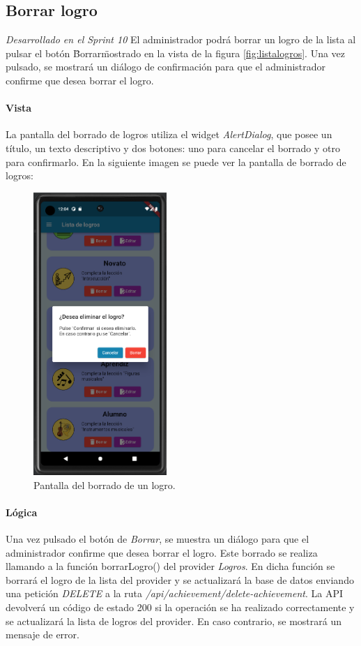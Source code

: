 \subsection{Borrar logro} 

\textit{Desarrollado en el Sprint 10}
El administrador podrá borrar un logro de la lista al pulsar el botón \"Borrar\" mostrado en la vista de la figura \ref{fig:listalogros}. 
Una vez pulsado, se mostrará un diálogo de confirmación para que el administrador confirme que desea borrar el logro.

\newpage
\paragraph*{Vista}
La pantalla del borrado de logros utiliza el widget \textit{AlertDialog}, que posee
un título, un texto descriptivo y dos botones: uno para cancelar el borrado y otro para confirmarlo.
En la siguiente imagen se puede ver la pantalla de borrado de logros:


\begin{figure}[H]
  \centering
  \includegraphics[width=0.45\textwidth]{imagenes/c7/borrarlogro.png}
  \caption{Pantalla del borrado de un logro.} 
  \label{fig:borradologro}
\end{figure}

\paragraph*{Lógica}
Una vez pulsado el botón de \textit{Borrar}, se muestra un diálogo para que el administrador confirme que desea borrar el logro.
Este borrado se realiza llamando a la función borrarLogro() del provider \textit{Logros}. 
En dicha función se borrará el logro de la lista del provider y se actualizará la base de datos enviando
una petición \textit{DELETE} a la ruta \textit{/api/achievement/delete-achievement}. 
La API devolverá un código de estado 200 si la operación se ha realizado correctamente y se actualizará la lista de logros del provider. 
En caso contrario, se mostrará un mensaje de error.



